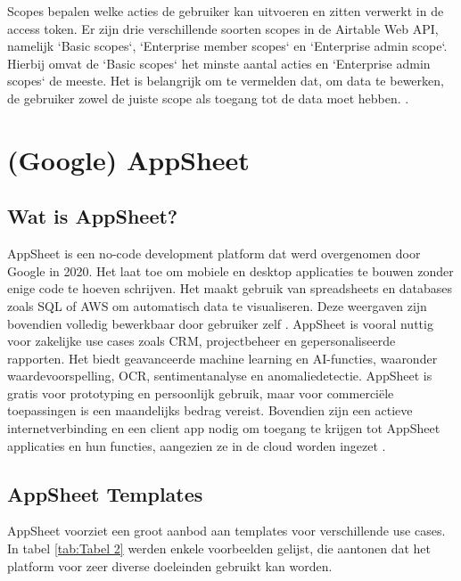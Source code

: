 Scopes bepalen welke acties de gebruiker kan uitvoeren en zitten verwerkt in de access token. Er zijn drie verschillende soorten scopes in de Airtable Web API, namelijk `Basic scopes`, `Enterprise member scopes` en `Enterprise admin scope`. Hierbij omvat de `Basic scopes` het minste aantal acties en `Enterprise admin scopes` de meeste. Het is belangrijk om te vermelden dat, om data te bewerken, de gebruiker zowel de juiste scope als toegang tot de data moet hebben. \autocite{AirtableAPIScopes}. \\

\section{(Google) AppSheet}
\label{sec:Appsheet}



\subsection{Wat is AppSheet?}
\label{subsec:wat_is_appsheet}

AppSheet is een no-code development platform dat werd overgenomen door Google in 2020. Het laat toe om mobiele en desktop applicaties te bouwen zonder enige code te hoeven schrijven. Het maakt gebruik van spreadsheets en databases zoals SQL of AWS om automatisch data te visualiseren. Deze weergaven zijn bovendien volledig bewerkbaar door gebruiker zelf \autocite{AppSheet2020}. AppSheet is vooral nuttig voor zakelijke use cases zoals CRM, projectbeheer en gepersonaliseerde rapporten. Het biedt geavanceerde machine learning en AI-functies, waaronder waardevoorspelling, OCR, sentimentanalyse en anomaliedetectie. AppSheet is gratis voor prototyping en persoonlijk gebruik, maar voor commerciële toepassingen is een maandelijks bedrag vereist. Bovendien zijn een actieve internetverbinding en een client app nodig om toegang te krijgen tot AppSheet applicaties en hun functies, aangezien ze in de cloud worden ingezet \autocite{Petrovic2020}. \\

\subsection{AppSheet Templates}
\label{subsec:appsheet_templates}


AppSheet voorziet een groot aanbod aan templates voor verschillende use cases. In tabel \ref{tab:Tabel 2} werden enkele voorbeelden gelijst, die aantonen dat het platform voor zeer diverse doeleinden gebruikt kan worden. 

